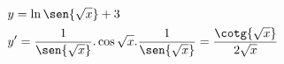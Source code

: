 \begin{ex}
\begin{align}
&y=\ln{\sen{\sqrt{x}}}+3\nonumber\\
&y'=\frac{1}{\sen{\sqrt{x}}}.\cos{\sqrt{x}}.\frac{1}{\sen{\sqrt{x}}}=\frac{\cotg{\sqrt{x}}}{2\sqrt{x}}\nonumber
\end{align}
\end{ex}